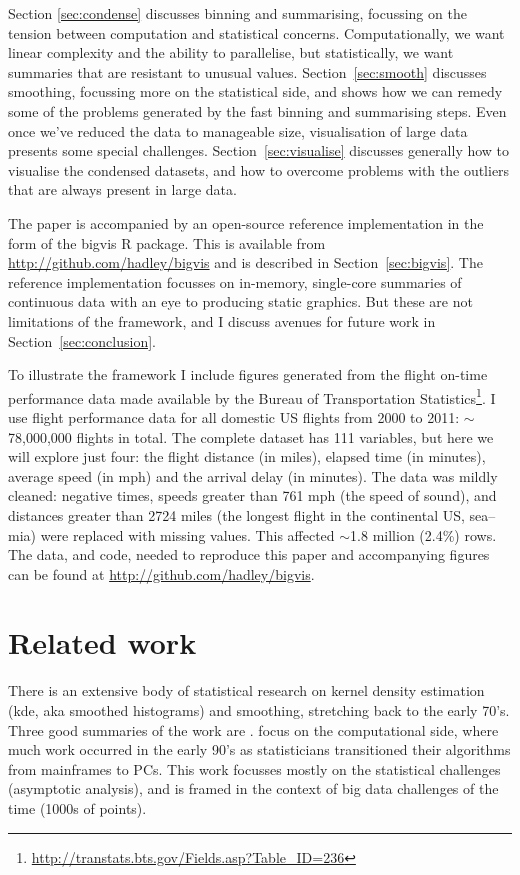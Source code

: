\documentclass[journal]{vgtc}                %
\begin{document}
Section \ref{sec:condense} discusses binning and summarising, focussing on the tension between computation and statistical concerns. Computationally, we want linear complexity and the ability to parallelise, but statistically, we want summaries that are resistant to unusual values. Section~\ref{sec:smooth} discusses smoothing, focussing more on the statistical side, and shows how we can remedy some of the problems generated by the fast binning and summarising steps. Even once we've reduced the data to manageable size, visualisation of large data presents some special challenges. Section~\ref{sec:visualise} discusses generally how to visualise the condensed datasets, and how to overcome problems with the outliers that are always present in large data.  

The paper is accompanied by an open-source reference implementation in the form of the bigvis R \citep{R} package. This is available from \url{http://github.com/hadley/bigvis} and is described in Section~\ref{sec:bigvis}. The reference implementation focusses on in-memory, single-core summaries of continuous data with an eye to producing static graphics. But these are not limitations of the framework, and I discuss avenues for future work in Section~\ref{sec:conclusion}. 

To illustrate the framework I include figures generated from the flight on-time performance data made available by the Bureau of Transportation Statistics\footnote{\url{http://transtats.bts.gov/Fields.asp?Table_ID=236}}. I use flight performance data for all domestic US flights from 2000 to 2011: $\sim$78,000,000 flights in total. The complete dataset has 111 variables, but here we will explore just four: the flight distance (in miles), elapsed time (in minutes), average speed (in mph) and the arrival delay (in minutes). The data was mildly cleaned: negative times, speeds greater than 761 mph (the speed of sound), and distances greater than 2724 miles (the longest flight in the continental US, {\sc sea}--{\sc mia}) were replaced with missing values. This affected $\sim$1.8 million (2.4\%) rows. The data, and code, needed to reproduce this paper and accompanying figures can be found at \url{http://github.com/hadley/bigvis}.

\section{Related work}
\label{sec:related-work}

There is an extensive body of statistical research on kernel density estimation (kde, aka smoothed histograms) and smoothing, stretching back to the early 70's. Three good summaries of the work are \cite{scott:1992,bowman:1997,loader:1999a}.    \cite{hardle:1992,wand:1994,fan:1994} focus on the computational side, where much work occurred in the early 90's as statisticians transitioned their algorithms from mainframes to PCs. This work focusses mostly on the statistical challenges (asymptotic analysis), and is framed in the context of big data challenges of the time (1000s of points).
\end{document}
